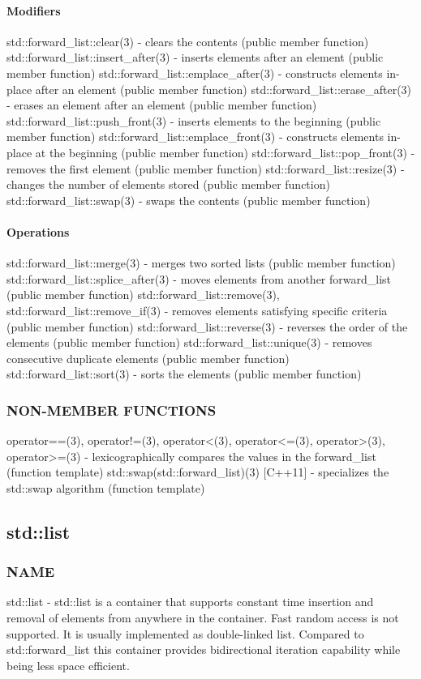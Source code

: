 \paragraph{Modifiers}
std::forward\_list::clear(3) - clears the contents   (public member function)
std::forward\_list::insert\_after(3) - inserts elements after an element   (public member function)
std::forward\_list::emplace\_after(3) - constructs elements in-place after an element   (public member function)
std::forward\_list::erase\_after(3) - erases an element after an element   (public member function)
std::forward\_list::push\_front(3) - inserts elements to the beginning  (public member function)
std::forward\_list::emplace\_front(3) - constructs elements in-place at the beginning   (public member function)
std::forward\_list::pop\_front(3) - removes the first element   (public member function)
std::forward\_list::resize(3) - changes the number of elements stored   (public member function)
std::forward\_list::swap(3) - swaps the contents   (public member function)
\paragraph{Operations}
std::forward\_list::merge(3) - merges two sorted lists  (public member function)
std::forward\_list::splice\_after(3) - moves elements from another forward\_list   (public member function)
std::forward\_list::remove(3), std::forward\_list::remove\_if(3) - removes elements satisfying specific criteria  (public member function)
std::forward\_list::reverse(3) - reverses the order of the elements  (public member function)
std::forward\_list::unique(3) - removes consecutive duplicate elements  (public member function)
std::forward\_list::sort(3) - sorts the elements  (public member function)

\subsubsection{NON-MEMBER FUNCTIONS}
operator==(3), operator!=(3), operator<(3), operator<=(3), operator>(3), operator>=(3) - lexicographically compares the values in the forward\_list   (function template)
std::swap(std::forward\_list)(3) [C++11] - specializes the std::swap algorithm   (function template)


\subsection{std::list}

\subsubsection{NAME}
std::list - std::list is a container that supports constant time insertion and removal of elements from anywhere in the container. Fast random access is not supported. It is usually implemented as double-linked list. Compared to std::forward\_list this container provides bidirectional iteration capability while being less space efficient.

